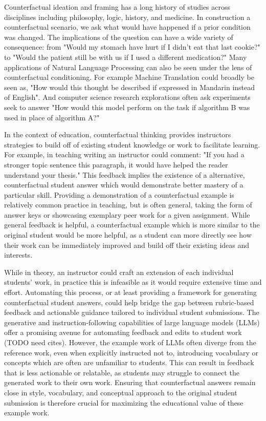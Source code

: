 
Counterfactual ideation and framing has a long history of studies across disciplines including philosophy, logic, history, and medicine. In construction a counterfactual scenario, we ask what would have happened if a prior condition was changed. The implications of the question can have a wide variety of consequence: from "Would my stomach have hurt if I didn't eat that last cookie?" to "Would the patient still be with us if I used a different medication?" Many applications of Natural Language Processing can also be seen under the lens of counterfactual conditioning. For example Machine Translation could broadly be seen as, "How would this thought be described if expressed in Mandarin instead of English". And computer science research explorations often ask experiments seek to answer "How would this model perform on the task if algorithm B was used in place of algorithm A?"

In the context of education, counterfactual thinking provides instructors strategies to build off of existing student knowledge or work to facilitate learning. For example, in teaching writing an instructor could comment: "If you had a stronger topic sentence this paragraph, it would have helped the reader understand your thesis." This feedback implies the existence of a alternative, counterfactual student answer which would demonstrate better mastery of a particular skill. Providing a demonstration of a counterfactual example is relatively common practice in teaching, but is often general, taking the form of answer keys or showcasing exemplary peer work for a given assignment. While general feedback is helpful, a counterfactual example which is more similar to the original student would be more helpful, as a student can more directly see how their work can be immediately improved and build off their existing ideas and interests. 

While in theory, an instructor could craft an extension of each individual students' work, in practice this is infeasible as it would require extensive time and effort.  Automating this process, or at least providing a framework for generating counterfactual student answers, could help bridge the gap between rubric-based feedback and actionable guidance tailored to individual student submissions. The generative and instruction-following capabilities of large language models (LLMs) offer a promising avenue for automating feedback and edits to student work (TODO need cites). However, the example work of LLMs often diverge from the reference work, even when explicitly instructed not to, introducing vocabulary or concepts which are often are unfamiliar to students. This can result in feedback that is less actionable or relatable, as students may struggle to connect the generated work to their own work. Ensuring that counterfactual answers remain close in style, vocabulary, and conceptual approach to the original student submission is therefore crucial for maximizing the educational value of these example work.

